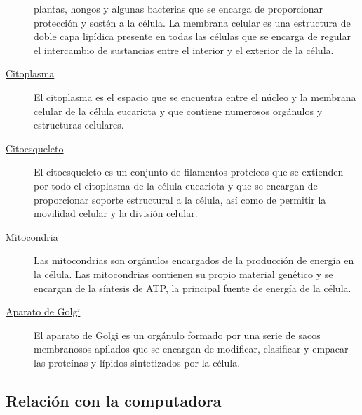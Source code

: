 \documentclass[
]{article}
\begin{document}
\begin{description}
plantas, hongos y algunas bacterias que se encarga de proporcionar
protección y sostén a la célula. La membrana celular es una estructura
de doble capa lipídica presente en todas las células que se encarga de
regular el intercambio de sustancias entre el interior y el exterior de
la célula.
\item[\uline{Citoplasma}]
El citoplasma es el espacio que se encuentra entre el núcleo y la
membrana celular de la célula eucariota y que contiene numerosos
orgánulos y estructuras celulares.
\item[\uline{Citoesqueleto}]
El citoesqueleto es un conjunto de filamentos proteicos que se extienden
por todo el citoplasma de la célula eucariota y que se encargan de
proporcionar soporte estructural a la célula, así como de permitir la
movilidad celular y la división celular.
\item[\uline{Mitocondria}]
Las mitocondrias son orgánulos encargados de la producción de energía en
la célula. Las mitocondrias contienen su propio material genético y se
encargan de la síntesis de ATP, la principal fuente de energía de la
célula.
\item[\uline{Aparato de Golgi}]
El aparato de Golgi es un orgánulo formado por una serie de sacos
membranosos apilados que se encargan de modificar, clasificar y empacar
las proteínas y lípidos sintetizados por la célula.
\end{description}

\hypertarget{relaciuxf3n-con-la-computadora}{%
\subsection{Relación con la
computadora}\label{relaciuxf3n-con-la-computadora}}
\end{document}
